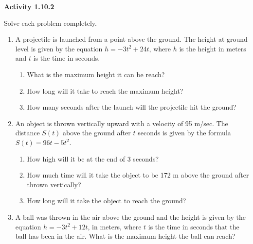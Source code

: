 \vspace{1ex}
\noindent\textbf{Activity 1.10.2}

\vspace{0.75ex}

Solve each problem completely. 
\begin{enumerate}[label = \color{blue}\arabic*. ]
\item A projectile is launched from a point above the ground. The height at ground level is given by the equation $ h = -3t^{2} + 24t $, where $h$ is the height in meters and $t$ is the time in seconds.

\begin{enumerate}[label = \color{blue}\alph*. ]
\item What is the maximum height it can be reach?
\item How long will it take to reach the maximum height?
\item How many seconds after the launch will the projectile hit the ground?
\end{enumerate}

\item An object is thrown vertically upward with a velocity of 95 m/sec. The distance $S(t)$ above the ground after $t$ seconds is given by the formula $S(t) = 96t - 5t^{2}$.
\begin{enumerate}[label = \color{blue}\alph*. ]
\item How high will it be at the end of 3 seconds?
\item How much time will it take the object to be 172 m above the ground after thrown vertically?
\item How long will it take the object to reach the ground?
\end{enumerate}

\item A ball was thrown in the air above the ground and the height is given by the equation $ h = -3t^{2} + 12t $, in meters, where $t$ is the time in seconds that the ball has been in the air. What is the maximum height the ball can reach?
\end{enumerate}
